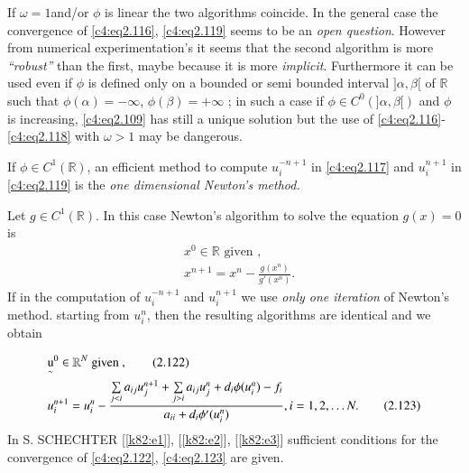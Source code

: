 \begin{remark}\label{c4:rem2.12}%
If $\omega = 1$\pageoriginale  and/or $\phi$ is linear the two
algorithms coincide. In the general case the convergence of
\eqref{c4:eq2.116}, \eqref{c4:eq2.119} seems to be an {\em open
  question}. However from numerical experimentation's it seems that
the second algorithm is more {\em ``robust''} than the first, maybe
because it is more {\em implicit}. Furthermore it can be used even if
$\phi$ is defined only on a bounded or semi bounded interval
$] \alpha, \beta [$ of $\mathbb{R}$ such that
$\phi(\alpha) = -\infty$, $\phi(\beta) = + \infty$ ; in such a case if
$\phi \in C^0(] \alpha, \beta [)$ and $\phi$ is
increasing, \eqref{c4:eq2.109} has still a unique solution but the use
of \eqref{c4:eq2.116}-\eqref{c4:eq2.118} with $\omega > 1$ may be
dangerous.  
\end{remark}

\begin{remark}\label{c4:rem2.13}%
If $\phi \in C^1( \mathbb{R})$, an efficient method to compute $u_i^{-n+1}$ in \eqref{c4:eq2.117} and $u_i^{n+1}$ in \eqref{c4:eq2.119} is the {\em one dimensional Newton's method.}

Let $g \in C^1(\mathbb{R})$. In this case Newton's algorithm to solve the equation $g(x) = 0$ is 
\begin{align}
& x^0 \in \mathbb{R} \text{ given }, \tag{2.120}\label{c4:eq2.120}\\
& x^{n+1} = x^n - \frac{g(x^n)}{g'(x^n)}. \tag{2.121}\label{c4:eq2.121}
\end{align}
If in the computation of $u_i^{-n+1}$ and $u_i^{n+1}$ we use {\em only one iteration} of Newton's method. starting from $u_i^n$, then the resulting algorithms are identical and we obtain
\end{remark}

\begin{algorithm} %
\begin{align}
& {\operatorname*{u}\limits_\sim}^0 \in \mathbb{R}^N \text{ given },
  \tag{2.122}\label{c4:eq2.122}\\ 
& u_i^{n+1} = u_i^n -\frac{\sum\limits_{j<i} a_{ij} u_j^{n+1} +
    \sum\limits_{j>i}a_{ij} u_j^n + d_i \phi (u_i^n)-f_i} {a_{ii}+d_i \phi'
    (u_i^n)}, i=1,2, \ldots N. \tag{2.123}\label{c4:eq2.123} 
\end{align}
In S. SCHECHTER [\ref{k82:e1}], [\ref{k82:e2}], [\ref{k82:e3}]
sufficient conditions for the 
convergence of \eqref{c4:eq2.122}, \eqref{c4:eq2.123} are given. 
\end{algorithm}

